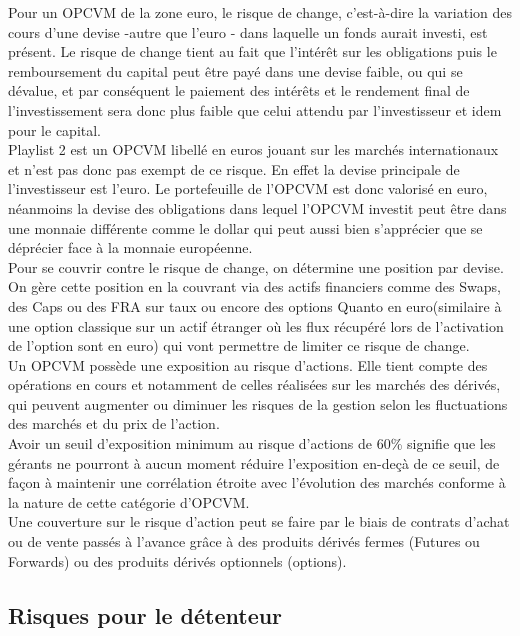 \documentclass[french,12pt,a4paper]{article}
\begin{document}
\indent Pour un OPCVM de la zone euro, le risque de change, c'est-à-dire la variation des cours d'une devise -autre que l'euro - dans laquelle un fonds aurait investi, est présent. Le risque de change tient au fait que l'intérêt sur les obligations puis le remboursement du capital peut être payé dans une devise faible, ou qui se dévalue, et par conséquent le paiement des intérêts et le rendement final de l'investissement sera donc plus faible que celui attendu par l'investisseur et idem pour le capital.\\
\indent Playlist 2 est un OPCVM libellé en euros jouant sur les marchés internationaux et n'est pas donc pas exempt de ce risque. En effet la devise principale de l'investisseur est l'euro. Le portefeuille de l'OPCVM est donc valorisé en euro, néanmoins la devise des obligations dans lequel l'OPCVM investit peut être dans une monnaie différente comme le dollar qui peut aussi bien s'apprécier que se déprécier face à la monnaie européenne. \\
\indent Pour se couvrir contre le risque de change, on détermine une position par devise. On gère cette position en la couvrant via des actifs financiers comme des Swaps, des Caps ou des FRA sur taux ou encore des options Quanto en euro(similaire à une option classique sur un actif étranger où les flux récupéré lors de l'activation de l'option sont en euro) qui vont permettre de limiter ce risque de change. \\

\indent Un OPCVM possède une exposition au risque d'actions. Elle tient compte des opérations en cours et notamment de celles réalisées sur les marchés des dérivés, qui peuvent augmenter ou diminuer les risques de la gestion selon les fluctuations des marchés et du prix de l'action. \\
Avoir un seuil d'exposition minimum au risque d'actions de 60\% signifie que les gérants ne pourront à aucun moment réduire l'exposition en-deçà de ce seuil, de façon à maintenir une corrélation étroite avec l'évolution des marchés conforme à la nature de cette catégorie d'OPCVM.\\
Une couverture sur le risque d'action peut se faire par le biais de contrats d'achat ou de vente passés à l'avance grâce à des produits dérivés fermes (Futures ou Forwards) ou des produits dérivés optionnels (options).\\


\subsection{Risques pour le détenteur}
\end{document}
